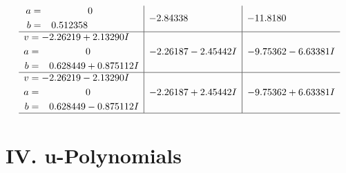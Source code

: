 \documentclass[1p]{elsarticle_modified}
\theoremstyle{definition}
\begin{document}
$$\begin{array}{c|c|c}
\begin{aligned}
a &= \phantom{-0.000000 } 0 \\
b &= \phantom{-}0.512358\phantom{ +0.000000I}\end{aligned}
 & -2.84338\phantom{ +0.000000I} & -11.8180\phantom{ +0.000000I} \\ \hline\begin{aligned}
v &= -2.26219 + 2.13290 I \\
a &= \phantom{-0.000000 } 0 \\
b &= \phantom{-}0.628449 + 0.875112 I\end{aligned}
 & -2.26187 - 2.45442 I & -9.75362 - 6.63381 I \\ \hline\begin{aligned}
v &= -2.26219 - 2.13290 I \\
a &= \phantom{-0.000000 } 0 \\
b &= \phantom{-}0.628449 - 0.875112 I\end{aligned}
 & -2.26187 + 2.45442 I & -9.75362 + 6.63381 I\\
 \hline 
 \end{array}$$\newpage
\newpage\renewcommand{\arraystretch}{1}
\centering \section*{ IV. u-Polynomials}
\end{document}
